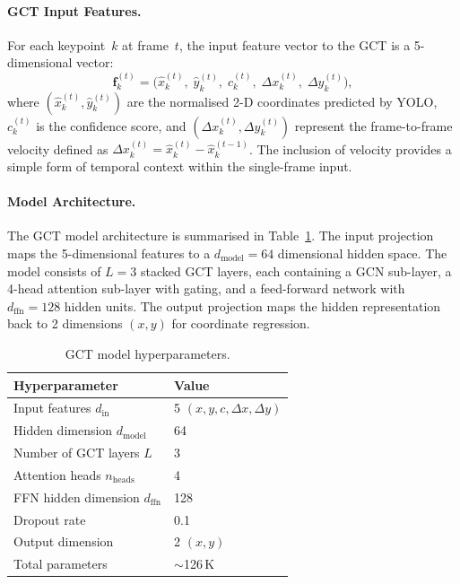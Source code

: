 \documentclass{article}
\begin{document}
\paragraph{GCT Input Features.}
For each keypoint~$k$ at frame~$t$, the input feature vector to the GCT
is a 5-dimensional vector:
\begin{equation}
  \mathbf{f}_k^{(t)} = \bigl(
    \hat{x}_k^{(t)},\;
    \hat{y}_k^{(t)},\;
    c_k^{(t)},\;
    \Delta x_k^{(t)},\;
    \Delta y_k^{(t)}
  \bigr),
  \label{eq:gct_input}
\end{equation}
where $(\hat{x}_k^{(t)}, \hat{y}_k^{(t)})$ are the normalised 2-D
coordinates predicted by YOLO, $c_k^{(t)}$ is the confidence score, and
$(\Delta x_k^{(t)}, \Delta y_k^{(t)})$ represent the frame-to-frame
velocity defined as
$\Delta x_k^{(t)} = \hat{x}_k^{(t)} - \hat{x}_k^{(t-1)}$.
The inclusion of velocity provides a simple form of temporal context
within the single-frame input.

\paragraph{Model Architecture.}
The GCT model architecture is summarised in
Table~\ref{tab:gct_hyperparams}.
The input projection maps the 5-dimensional features to a
$d_{\mathrm{model}} = 64$ dimensional hidden space.
The model consists of $L = 3$ stacked GCT layers, each containing a GCN
sub-layer, a 4-head attention sub-layer with gating, and a feed-forward
network with $d_{\mathrm{ffn}} = 128$ hidden units.
The output projection maps the hidden representation back to 2
dimensions $(x, y)$ for coordinate regression.

\begin{table}[htbp]
  \centering
  \caption{GCT model hyperparameters.}
  \label{tab:gct_hyperparams}
  \begin{tabular}{@{}ll@{}}
    \toprule
    Hyperparameter & Value \\
    \midrule
    Input features $d_{\mathrm{in}}$
      & 5 $(x, y, c, \Delta x, \Delta y)$ \\
    Hidden dimension $d_{\mathrm{model}}$ & 64 \\
    Number of GCT layers $L$ & 3 \\
    Attention heads $n_{\mathrm{heads}}$ & 4 \\
    FFN hidden dimension $d_{\mathrm{ffn}}$ & 128 \\
    Dropout rate & 0.1 \\
    Output dimension & 2 $(x, y)$ \\
    Total parameters & $\sim$126\,K \\
    \bottomrule
  \end{tabular}
\end{table}
\end{document}

